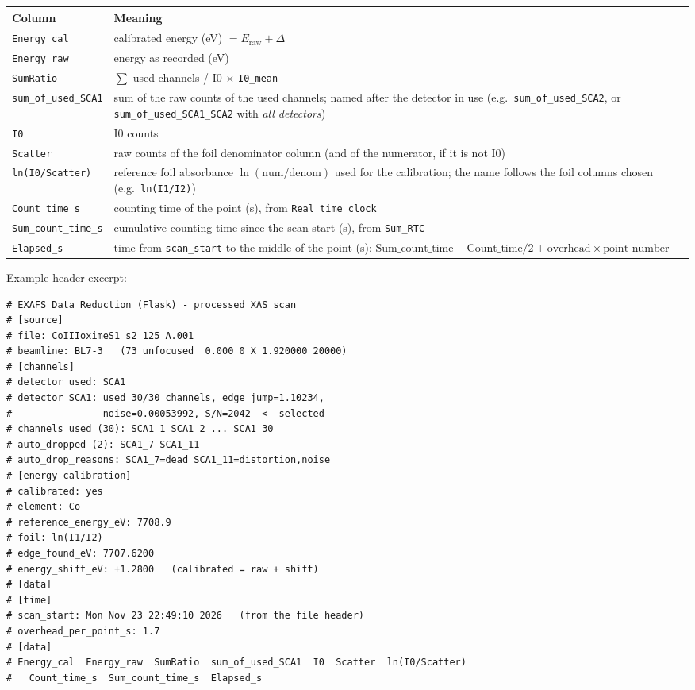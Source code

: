 \documentclass[11pt,a4paper]{article}
\newcommand{\col}[1]{\texttt{#1}}                  %
\begin{document}
\begin{center}
\begin{tabularx}{\linewidth}{@{}lX@{}}
\toprule
Column & Meaning\\
\midrule
\col{Energy\_cal} & calibrated energy (eV) $= E_\text{raw} + \Delta$\\
\col{Energy\_raw} & energy as recorded (eV)\\
\col{SumRatio}    & $\sum$ used channels / I0 $\times$ \texttt{I0\_mean}\\
\col{sum\_of\_used\_SCA1} & sum of the raw counts of the used channels; named after the detector in use
                    (e.g.\ \col{sum\_of\_used\_SCA2}, or \col{sum\_of\_used\_SCA1\_SCA2} with \emph{all detectors})\\
\col{I0}          & I0 counts\\
\col{Scatter}     & raw counts of the foil denominator column (and of the numerator, if it is not I0)\\
\col{ln(I0/Scatter)} & reference foil absorbance $\ln(\text{num}/\text{denom})$ used for the calibration;
                    the name follows the foil columns chosen (e.g.\ \col{ln(I1/I2)})\\
\col{Count\_time\_s} & counting time of the point (s), from \col{Real time clock}\\
\col{Sum\_count\_time\_s} & cumulative counting time since the scan start (s), from \col{Sum\_RTC}\\
\col{Elapsed\_s}  & time from \texttt{scan\_start} to the middle of the point (s):
                    $\text{Sum\_count\_time} - \text{Count\_time}/2 + \text{overhead}\times\text{point number}$\\
\bottomrule
\end{tabularx}
\end{center}
Example header excerpt:
\begin{shell}
\begin{Verbatim}[fontsize=\small]
# EXAFS Data Reduction (Flask) - processed XAS scan
# [source]
# file: CoIIIoximeS1_s2_125_A.001
# beamline: BL7-3   (73 unfocused  0.000 0 X 1.920000 20000)
# [channels]
# detector_used: SCA1
# detector SCA1: used 30/30 channels, edge_jump=1.10234,
#                noise=0.00053992, S/N=2042  <- selected
# channels_used (30): SCA1_1 SCA1_2 ... SCA1_30
# auto_dropped (2): SCA1_7 SCA1_11
# auto_drop_reasons: SCA1_7=dead SCA1_11=distortion,noise
# [energy calibration]
# calibrated: yes
# element: Co
# reference_energy_eV: 7708.9
# foil: ln(I1/I2)
# edge_found_eV: 7707.6200
# energy_shift_eV: +1.2800   (calibrated = raw + shift)
# [data]
# [time]
# scan_start: Mon Nov 23 22:49:10 2026   (from the file header)
# overhead_per_point_s: 1.7
# [data]
# Energy_cal  Energy_raw  SumRatio  sum_of_used_SCA1  I0  Scatter  ln(I0/Scatter)
#   Count_time_s  Sum_count_time_s  Elapsed_s
\end{Verbatim}
\end{shell}
\end{document}
